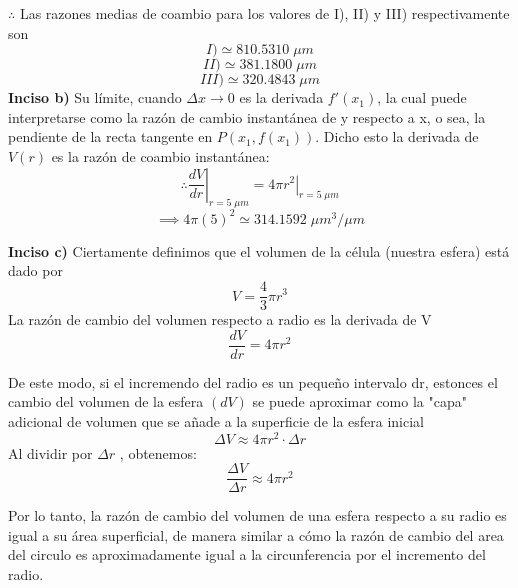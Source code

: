 $\therefore$ Las razones medias de coambio para los valores de I), II) y III) respectivamente son
$$I)\simeq 810.5310 \; \mu m$$
$$II)\simeq 381.1800\; \mu m$$
$$III)\simeq 320.4843\;\mu m$$
\textbf{Inciso b)} Su límite, cuando $\Delta x \rightarrow 0$ es la derivada $f'(x_1)$, la cual puede interpretarse como la razón de cambio instantánea de y respecto a x, o sea, la pendiente de la recta tangente en $P(x_1, f(x_1))$.
Dicho esto la derivada de $V(r)$ es la razón de coambio instantánea: $$\therefore \left.\frac{dV}{dr}\right|_{r=5\;\mu m}=\left . 4\pi r^2\right|_{r=5\;\mu m}$$
$$\implies 4\pi (5)^2\simeq 314.1592 \;\mu m^3/\mu m$$

\textbf{Inciso c)} Ciertamente definimos que el volumen de la célula (nuestra esfera) está dado por $$V=\frac{4}{3}\pi r^3$$
La razón de cambio del volumen respecto a radio es la derivada de V $$\frac{dV}{dr}=4\pi r^2$$

De este modo, si el incremendo del radio es un pequeño intervalo  dr, estonces el cambio del volumen de la esfera $(dV)$ se puede aproximar como la "capa" adicional de volumen que se añade a la superficie de la esfera inicial
$$\Delta V \approx 4\pi r^2 \cdot \Delta r$$
Al dividir por $\Delta r$ , obtenemos:$$\frac{\Delta V}{\Delta r} \approx 4\pi r^2$$

Por lo tanto, la razón de cambio del volumen de una esfera respecto a su radio es igual a su área superficial, de manera similar a cómo la razón de cambio del area del circulo es aproximadamente igual a la circunferencia por el incremento del radio.

